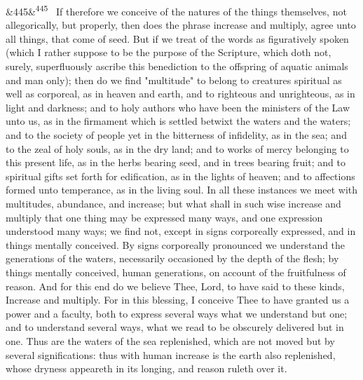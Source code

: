 \documentclass[12pt]{article}
\newcommand{\para}[1][]{\par\noindent\ifx&#1&\else\textsuperscript{\footnotesize #1}~\fi}
\begin{document}
\para[445] If therefore we conceive of the natures of the things themselves, not allegorically, but properly, then does the phrase increase and multiply, agree unto all things, that come of seed. But if we treat of the words as figuratively spoken (which I rather suppose to be the purpose of the Scripture, which doth not, surely, superfluously ascribe this benediction to the offspring of aquatic animals and man only); then do we find "multitude" to belong to creatures spiritual as well as corporeal, as in heaven and earth, and to righteous and unrighteous, as in light and darkness; and to holy authors who have been the ministers of the Law unto us, as in the firmament which is settled betwixt the waters and the waters; and to the society of people yet in the bitterness of infidelity, as in the sea; and to the zeal of holy souls, as in the dry land; and to works of mercy belonging to this present life, as in the herbs bearing seed, and in trees bearing fruit; and to spiritual gifts set forth for edification, as in the lights of heaven; and to affections formed unto temperance, as in the living soul. In all these instances we meet with multitudes, abundance, and increase; but what shall in such wise increase and multiply that one thing may be expressed many ways, and one expression understood many ways; we find not, except in signs corporeally expressed, and in things mentally conceived. By signs corporeally pronounced we understand the generations of the waters, necessarily occasioned by the depth of the flesh; by things mentally conceived, human generations, on account of the fruitfulness of reason. And for this end do we believe Thee, Lord, to have said to these kinds, Increase and multiply. For in this blessing, I conceive Thee to have granted us a power and a faculty, both to express several ways what we understand but one; and to understand several ways, what we read to be obscurely delivered but in one. Thus are the waters of the sea replenished, which are not moved but by several significations: thus with human increase is the earth also replenished, whose dryness appeareth in its longing, and reason ruleth over it.
\end{document}
